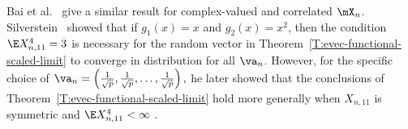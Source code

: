 \noindent
Bai et al.~\cite{bai2007ael} give a similar result for complex-valued and correlated $\mX_n$.  Silverstein~\cite{silverstein1989eld} showed that if $g_1(x) = x$ and $g_2(x) = x^2$, then the condition $\E X_{n,11}^4 = 3$ is necessary for the random vector in Theorem~\ref{T:evec-functional-scaled-limit} to converge in distribution for all $\va_n$.  However, for the specific choice of
\(
    \va_n
    =
    \left(
        \frac{1}{\sqrt{p}},
        \frac{1}{\sqrt{p}},
        \ldots,        
        \frac{1}{\sqrt{p}}        
    \right),
\)
he later showed that the conclusions of Theorem~\ref{T:evec-functional-scaled-limit} hold more generally when $X_{n,11}$ is symmetric and $\E X_{n,11}^4 < \infty$ \cite{silverstein1990wcr}.  
